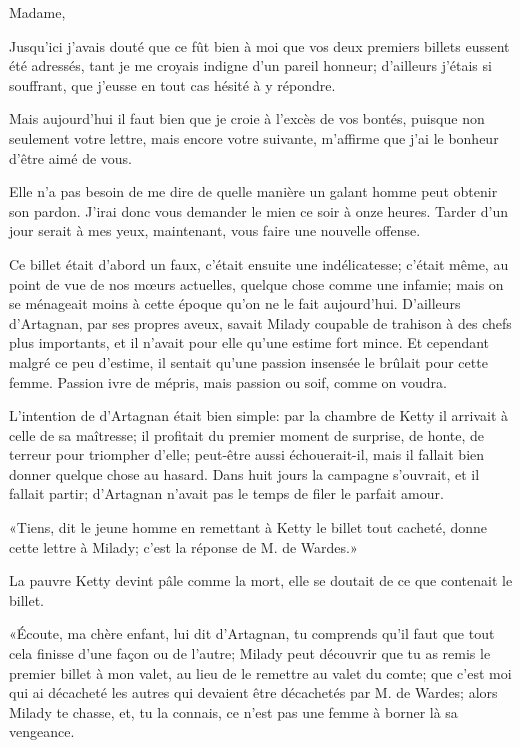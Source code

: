 \begin{mail}{}{Madame,}
	
Jusqu'ici j'avais douté que ce fût bien à moi que vos deux premiers billets eussent été adressés, tant je me croyais indigne d'un pareil honneur; d'ailleurs j'étais si souffrant, que j'eusse en tout cas hésité à y répondre. 

Mais aujourd'hui il faut bien que je croie à l'excès de vos bontés, puisque non seulement votre lettre, mais encore votre suivante, m'affirme que j'ai le bonheur d'être aimé de vous. 

Elle n'a pas besoin de me dire de quelle manière un galant homme peut obtenir son pardon. J'irai donc vous demander le mien ce soir à onze heures. Tarder d'un jour serait à mes yeux, maintenant, vous faire une nouvelle offense. 

\end{mail}

Ce billet était d'abord un faux, c'était ensuite une indélicatesse; c'était même, au point de vue de nos mœurs actuelles, quelque chose comme une infamie; mais on se ménageait moins à cette époque qu'on ne le fait aujourd'hui. D'ailleurs d'Artagnan, par ses propres aveux, savait Milady coupable de trahison à des chefs plus importants, et il n'avait pour elle qu'une estime fort mince. Et cependant malgré ce peu d'estime, il sentait qu'une passion insensée le brûlait pour cette femme. Passion ivre de mépris, mais passion ou soif, comme on voudra. 

L'intention de d'Artagnan était bien simple: par la chambre de Ketty il arrivait à celle de sa maîtresse; il profitait du premier moment de surprise, de honte, de terreur pour triompher d'elle; peut-être aussi échouerait-il, mais il fallait bien donner quelque chose au hasard. Dans huit jours la campagne s'ouvrait, et il fallait partir; d'Artagnan n'avait pas le temps de filer le parfait amour. 

«Tiens, dit le jeune homme en remettant à Ketty le billet tout cacheté, donne cette lettre à Milady; c'est la réponse de M. de Wardes.» 

La pauvre Ketty devint pâle comme la mort, elle se doutait de ce que contenait le billet. 

«Écoute, ma chère enfant, lui dit d'Artagnan, tu comprends qu'il faut que tout cela finisse d'une façon ou de l'autre; Milady peut découvrir que tu as remis le premier billet à mon valet, au lieu de le remettre au valet du comte; que c'est moi qui ai décacheté les autres qui devaient être décachetés par M. de Wardes; alors Milady te chasse, et, tu la connais, ce n'est pas une femme à borner là sa vengeance. 

